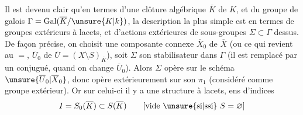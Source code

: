 Il est devenu clair qu'en termes d'une
clôture algébrique \(\overline K\) de \(K\), et du
groupe de galois  \(\Gamma=\operatorname{Gal}(\overline K/\unsure{K|k})\), la
description la plus simple est en
termes de groupes extérieurs à lacets, et
d'actions extérieures de sous-groupes  \(\Sigma\subset\Gamma\)
dessus. De façon précise,  on
choisit une composante connexe
\(\overline X_0\) de \(\overline X\) (ou ce qui revient au \(=\),
\(\overline U_0\) de \(\overline U=(X\setminus S)_{\overline K}\)), soit \(\Sigma\) son
stabilisateur dans \(\Gamma\) (il est remplacé
par un conjugué, quand on change
\(\overline U_0\)). Alors \(\Sigma\) opère sur le schéma
\(\unsure{\overline U_0|\overline X_0}\), donc opère extérieurement sur son
\(\pi_1\) (considéré comme groupe extérieur).
Or sur celui-ci il y a une structure
à lacets,  ens d'indices
\[
I=S_0(\overline K)\subset S(\overline K)
\qquad[\text{vide \unsure{si|ssi} }S=\varnothing]
\]
